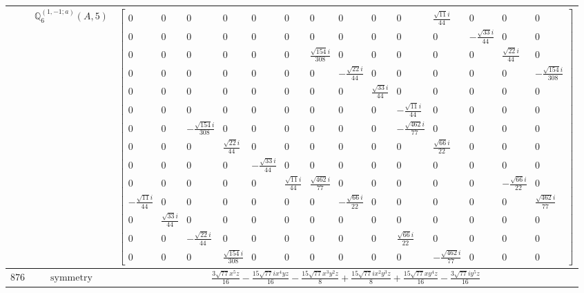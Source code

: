 \documentclass[fleqn,8pt,landscape]{jsarticle}
\begin{document}
\begin{longtable}{ccc}
$  $ & $ \mathbb{Q}_{6}^{(1,-1;a)}(A,5) $ & $ \begin{bmatrix} 0 & 0 & 0 & 0 & 0 & 0 & 0 & 0 & 0 & 0 & \frac{\sqrt{11} i}{44} & 0 & 0 & 0 \\ 0 & 0 & 0 & 0 & 0 & 0 & 0 & 0 & 0 & 0 & 0 & - \frac{\sqrt{33} i}{44} & 0 & 0 \\ 0 & 0 & 0 & 0 & 0 & 0 & \frac{\sqrt{154} i}{308} & 0 & 0 & 0 & 0 & 0 & \frac{\sqrt{22} i}{44} & 0 \\ 0 & 0 & 0 & 0 & 0 & 0 & 0 & - \frac{\sqrt{22} i}{44} & 0 & 0 & 0 & 0 & 0 & - \frac{\sqrt{154} i}{308} \\ 0 & 0 & 0 & 0 & 0 & 0 & 0 & 0 & \frac{\sqrt{33} i}{44} & 0 & 0 & 0 & 0 & 0 \\ 0 & 0 & 0 & 0 & 0 & 0 & 0 & 0 & 0 & - \frac{\sqrt{11} i}{44} & 0 & 0 & 0 & 0 \\ 0 & 0 & - \frac{\sqrt{154} i}{308} & 0 & 0 & 0 & 0 & 0 & 0 & - \frac{\sqrt{462} i}{77} & 0 & 0 & 0 & 0 \\ 0 & 0 & 0 & \frac{\sqrt{22} i}{44} & 0 & 0 & 0 & 0 & 0 & 0 & \frac{\sqrt{66} i}{22} & 0 & 0 & 0 \\ 0 & 0 & 0 & 0 & - \frac{\sqrt{33} i}{44} & 0 & 0 & 0 & 0 & 0 & 0 & 0 & 0 & 0 \\ 0 & 0 & 0 & 0 & 0 & \frac{\sqrt{11} i}{44} & \frac{\sqrt{462} i}{77} & 0 & 0 & 0 & 0 & 0 & - \frac{\sqrt{66} i}{22} & 0 \\ - \frac{\sqrt{11} i}{44} & 0 & 0 & 0 & 0 & 0 & 0 & - \frac{\sqrt{66} i}{22} & 0 & 0 & 0 & 0 & 0 & \frac{\sqrt{462} i}{77} \\ 0 & \frac{\sqrt{33} i}{44} & 0 & 0 & 0 & 0 & 0 & 0 & 0 & 0 & 0 & 0 & 0 & 0 \\ 0 & 0 & - \frac{\sqrt{22} i}{44} & 0 & 0 & 0 & 0 & 0 & 0 & \frac{\sqrt{66} i}{22} & 0 & 0 & 0 & 0 \\ 0 & 0 & 0 & \frac{\sqrt{154} i}{308} & 0 & 0 & 0 & 0 & 0 & 0 & - \frac{\sqrt{462} i}{77} & 0 & 0 & 0 \end{bmatrix} $ \\ \hline
$ 876 $ & $ \text{symmetry} $ & $ \frac{3 \sqrt{77} x^{5} z}{16} - \frac{15 \sqrt{77} i x^{4} y z}{16} - \frac{15 \sqrt{77} x^{3} y^{2} z}{8} + \frac{15 \sqrt{77} i x^{2} y^{3} z}{8} + \frac{15 \sqrt{77} x y^{4} z}{16} - \frac{3 \sqrt{77} i y^{5} z}{16} $ \\

\end{longtable}
\end{document}
